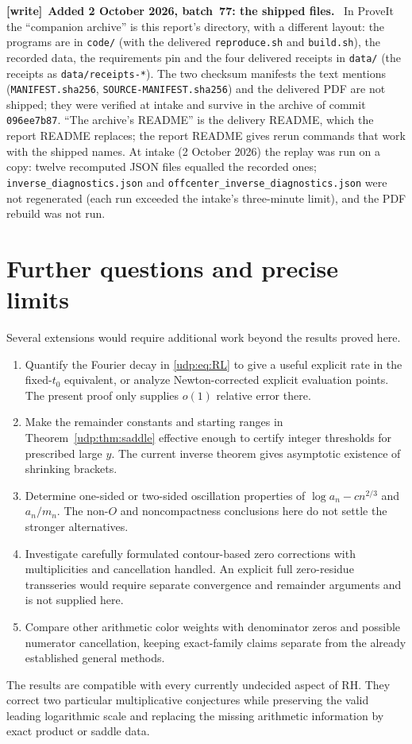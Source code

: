 \documentclass[11pt]{article}
\theoremstyle{remark}\newtheorem{remark}[theorem]{Remark}
\newenvironment{writenote}[1][]{\par\smallskip\begingroup\small
 \noindent\textbf{[write]}\if\relax\detokenize{#1}\relax\else~\textbf{#1.}\fi\ }%
 {\par\endgroup\smallskip}
\numberwithin{equation}{section}
\begin{document}
\begin{writenote}[Added 2 October 2026, batch~77: the shipped files]
In ProveIt the ``companion archive'' is this report's directory, with a
different layout: the programs are in \texttt{code/} (with the delivered
\texttt{reproduce.sh} and \texttt{build.sh}), the recorded data, the
requirements pin and the four delivered receipts in \texttt{data/} (the
receipts as \texttt{data/receipts-*}). The two checksum manifests the text
mentions (\texttt{MANIFEST.sha256}, \texttt{SOURCE-MANIFEST.sha256}) and the
delivered PDF are not shipped; they were verified at intake and survive in
the archive of commit \texttt{096ee7b87}. ``The archive's README'' is the
delivery README, which the report README replaces; the report README gives
rerun commands that work with the shipped names. At intake (2 October 2026)
the replay was run on a copy: twelve recomputed JSON files equalled the
recorded ones; \texttt{inverse\_diagnostics.json} and
\texttt{offcenter\_inverse\_diagnostics.json} were not regenerated (each run
exceeded the intake's three-minute limit), and the PDF rebuild was not run.
\end{writenote}

\section{Further questions and precise limits}\label{udp:sec:questions}
Several extensions would require additional work beyond the results proved here.
\begin{enumerate}
\item Quantify the Fourier decay in \eqref{udp:eq:RL} to give a useful explicit rate in the fixed-$t_0$ equivalent, or analyze Newton-corrected explicit evaluation points. The present proof only supplies $o(1)$ relative error there.
\item Make the remainder constants and starting ranges in Theorem~\ref{udp:thm:saddle} effective enough to certify integer thresholds for prescribed large $y$. The current inverse theorem gives asymptotic existence of shrinking brackets.
\item Determine one-sided or two-sided oscillation properties of $\log a_n-cn^{2/3}$ and $a_n/m_n$. The non-$O$ and noncompactness conclusions here do not settle the stronger alternatives.
\item Investigate carefully formulated contour-based zero corrections with multiplicities and cancellation handled. An explicit full zero-residue transseries would require separate convergence and remainder arguments and is not supplied here.
\item Compare other arithmetic color weights with denominator zeros and possible numerator cancellation, keeping exact-family claims separate from the already established general methods.
\end{enumerate}
The results are compatible with every currently undecided aspect of RH. They correct two particular multiplicative conjectures while preserving the valid leading logarithmic scale and replacing the missing arithmetic information by exact product or saddle data.
\end{document}
